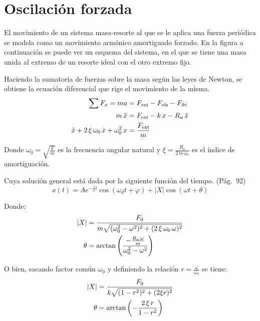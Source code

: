 \documentclass[a5paper,12pt,twoside]{book}
\begin{document}
\section{Oscilación forzada}
\label{sec:oscilacionForzada}

El movimiento de un sistema masa-resorte al que se le aplica una fuerza periódica se modela como un movimiento armónico amortiguado forzado.
En la figura a continuación se puede ver un esquema del sistema, en el que se tiene una masa unida al extremo de un resorte ideal con el otro extremo fijo.

\begin{center}
    \def\svgwidth{0.5\linewidth}
    
\end{center}

Haciendo la sumatoria de fuerzas sobre la masa según las leyes de Newton, se obtiene la ecuación diferencial que rige el movimiento de la misma.
\begin{align*}
    \sum F_x = m a &= {{F}_\textsl{{ext}}} - {{F}_\textsl{{ela}}} - {{F}_\textsl{{fri}}}
    \\
    m \, \ddot{x} &= {{F}_\textsl{{ext}}} - k \, x - R_a \, \dot{x}
    \\
    \ddot{x} + 2 \, \xi \, \omega_0 \, \dot{x} + \omega_0^2 \, x &= \frac{{{F}_\textsl{{ext}}}}{m}
\end{align*}

Donde $\omega_0=\sqrt{\frac{k}{m}}$ es la frecuencia angular natural y $\xi=\frac{R_a}{2 \, m \, \omega_0}$ es el índice de amortiguación.

Cuya solución general está dada por la siguiente función del tiempo. \cite{1} (Pág.~92)
\begin{equation*}
    x(t) = A e^{-\tfrac{\gamma}{2}t} \cos{(\omega_d t + \varphi)} + |X| \cos (\omega t + \theta)
\end{equation*}

Donde:
\begin{align*}
    {\left| {X} \right|} &= \frac{F_0}{m \sqrt{(\omega_0^2-\omega^2)^2+(2 \, \xi \, \omega_0 \, \omega)^2}}
    \\
    \theta &= \arctan \left( \frac{-\frac{R_a \, \omega}{m}}{\omega_0^2 - \omega^2} \right)
\end{align*}

O bien, sacando factor común $\omega_0$ y definiendo la relación $r = \frac{\omega}{\omega_0}$ se tiene:
\begin{align*}
    {\left| {X} \right|} &= \frac{F_0}{k \sqrt{(1-r^2)^2+(2 \xi r)^2}}
    \\
    \theta &= \arctan \left( - \frac{2 \, \xi \, r}{1-r^2} \right)
\end{align*}
\end{document}
